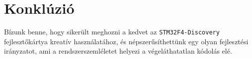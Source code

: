 \section{Konklúzió}

\cite{2009AGUFMOS21A1152W}
Bízunk benne, hogy sikerült meghozni a kedvet az \verb!STM32F4-Discovery! fejlesztőkártya kreatív használatához, és népszerűsíthettünk egy olyan fejlesztési irányzatot, ami a rendszerszemléletet helyezi a végeláthatatlan kódolás elé.

